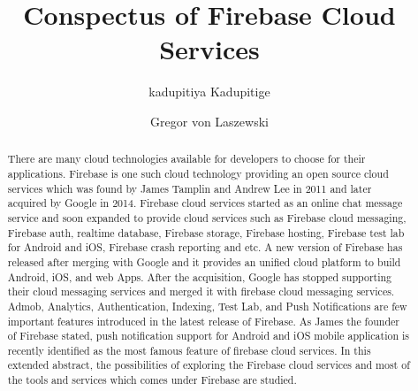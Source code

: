 
\title{Conspectus of Firebase Cloud Services}


\author{kadupitiya Kadupitige}

\author{Gregor von Laszewski}


\renewcommand{\shortauthors}{G. v. Laszewski}


\begin{abstract}
There are many cloud technologies available for developers to choose
for their applications.  Firebase is one such cloud technology
providing an open source cloud services which was found by James
Tamplin and Andrew Lee in 2011 and later acquired by Google in
2014. Firebase cloud services started as an online chat message
service and soon expanded to provide cloud services such as Firebase
cloud messaging, Firebase auth, realtime database, Firebase storage,
Firebase hosting, Firebase test lab for Android and iOS, Firebase
crash reporting and etc. A new version of Firebase has released after
merging with Google and it provides an unified cloud platform to build
Android, iOS, and web Apps.  After the acquisition, Google has stopped
supporting their cloud messaging services and merged it with firebase
cloud messaging services. Admob, Analytics, Authentication, Indexing,
Test Lab, and Push Notifications are few important features introduced
in the latest release of Firebase. As James the founder of Firebase
stated, push notification support for Android and iOS mobile
application is recently identified as the most famous feature of
firebase cloud services.  In this extended abstract, the possibilities
of exploring the Firebase cloud services and most of the tools and
services which comes under Firebase are studied.

\end{abstract}



\maketitle


